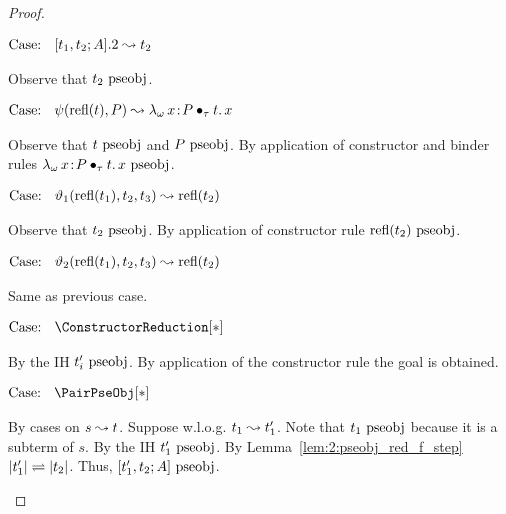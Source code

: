 \begin{proof}
\begin{proofcase}
        $\text{Case: }\begin{array}{c} [t_1, t_2; A].2 \leadsto t_2 \end{array}$
        \begin{proofcase}
            Observe that $t_2~\mbox{\normalfont pseobj}$.
        \end{proofcase}

        $\text{Case: }\begin{array}{c} \psi(\text{refl}(t),P) \leadsto {\lambda_\omega}\, x\! : \! P \bullet_{\tau} t.\, x \end{array}$
        \begin{proofcase}
            Observe that $t~\mbox{\normalfont pseobj}$ and $P~\mbox{\normalfont pseobj}$.
            By application of constructor and binder rules ${\lambda_\omega}\, x\! : \! P \bullet_{\tau} t.\, x~\mbox{\normalfont pseobj}$.
        \end{proofcase}

        $\text{Case: }\begin{array}{c} \vartheta_1(\text{refl}(t_1), t_2, t_3) \leadsto \text{refl}(t_2) \end{array}$
        \begin{proofcase}
            Observe that $t_2~\mbox{\normalfont pseobj}$.
            By application of constructor rule $\text{refl}(t_2)~\mbox{\normalfont pseobj}$.
        \end{proofcase}

        $\text{Case: }\begin{array}{c} \vartheta_2(\text{refl}(t_1), t_2, t_3) \leadsto \text{refl}(t_2) \end{array}$
        \begin{proofcase}
            Same as previous case.
        \end{proofcase}

        $\text{Case: }\begin{array}{c} \ConstructorReduction[*] \end{array}$
        \begin{proofcase}
            By the IH $t_i^\prime~\mbox{\normalfont pseobj}$.
            By application of the constructor rule the goal is obtained.
        \end{proofcase}

    \end{proofcase}

    $\text{Case: }\begin{array}{c} \PairPseObj[*] \end{array}$
    \begin{proofcase}
        By cases on $s \leadsto t$.
        Suppose w.l.o.g. $t_1 \leadsto t_1^\prime$.
        Note that $t_1~\mbox{\normalfont pseobj}$ because it is a subterm of $s$.
        By the IH $t_1^\prime~\mbox{\normalfont pseobj}$.
        By Lemma~\ref{lem:2:pseobj_red_f_step} $|t_1^\prime| \rightleftharpoons |t_2|$.
        Thus, $[t_1^\prime, t_2; A]~\mbox{\normalfont pseobj}$.
    \end{proofcase}


\end{proof}
